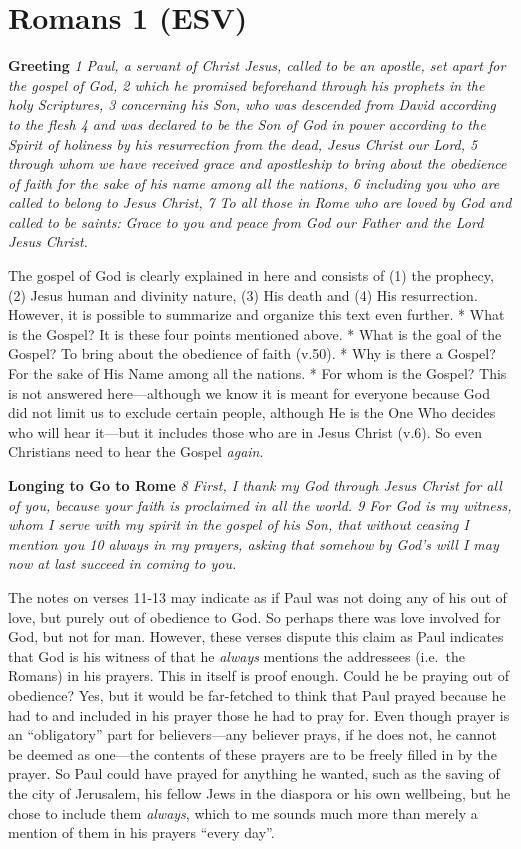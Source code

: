 \hypertarget{romans-1-esv}{%
\section{Romans 1 (ESV)}\label{romans-1-esv}}

\textbf{Greeting} \emph{1 Paul, a servant of Christ Jesus, called to be
an apostle, set apart for the gospel of God, 2 which he promised
beforehand through his prophets in the holy Scriptures, 3 concerning his
Son, who was descended from David according to the flesh 4 and was
declared to be the Son of God in power according to the Spirit of
holiness by his resurrection from the dead, Jesus Christ our Lord, 5
through whom we have received grace and apostleship to bring about the
obedience of faith for the sake of his name among all the nations, 6
including you who are called to belong to Jesus Christ,} \emph{7 To all
those in Rome who are loved by God and called to be saints:} \emph{Grace
to you and peace from God our Father and the Lord Jesus Christ.}

The gospel of God is clearly explained in here and consists of (1) the
prophecy, (2) Jesus human and divinity nature, (3) His death and (4) His
resurrection. However, it is possible to summarize and organize this
text even further. * What is the Gospel? It is these four points
mentioned above. * What is the goal of the Gospel? To bring about the
obedience of faith (v.50). * Why is there a Gospel? For the sake of His
Name among all the nations. * For whom is the Gospel? This is not
answered here---although we know it is meant for everyone because God
did not limit us to exclude certain people, although He is the One Who
decides who will hear it---but it includes those who are in Jesus Christ
(v.6). So even Christians need to hear the Gospel \emph{again}.

\textbf{Longing to Go to Rome} \emph{8 First, I thank my God through
Jesus Christ for all of you, because your faith is proclaimed in all the
world. 9 For God is my witness, whom I serve with my spirit in the
gospel of his Son, that without ceasing I mention you 10 always in my
prayers, asking that somehow by God's will I may now at last succeed in
coming to you.}

The notes on verses 11-13 may indicate as if Paul was not doing any of
his out of love, but purely out of obedience to God. So perhaps there
was love involved for God, but not for man. However, these verses
dispute this claim as Paul indicates that God is his witness of that he
\emph{always} mentions the addressees (i.e.~the Romans) in his prayers.
This in itself is proof enough. Could he be praying out of obedience?
Yes, but it would be far-fetched to think that Paul prayed because he
had to and included in his prayer those he had to pray for. Even though
prayer is an ``obligatory'' part for believers---any believer prays, if
he does not, he cannot be deemed as one---the contents of these prayers
are to be freely filled in by the prayer. So Paul could have prayed for
anything he wanted, such as the saving of the city of Jerusalem, his
fellow Jews in the diaspora or his own wellbeing, but he chose to
include them \emph{always}, which to me sounds much more than merely a
mention of them in his prayers ``every day''.

